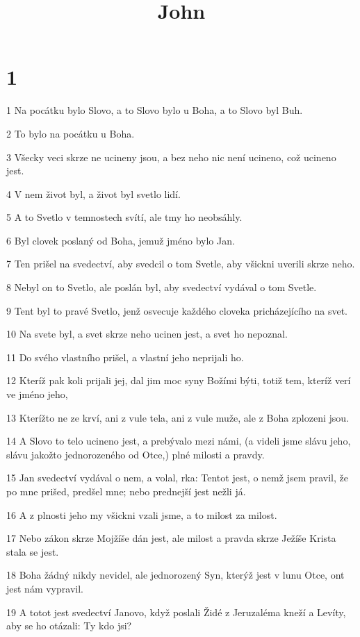 

\title{John}

\chapter{1}

\par 1 Na pocátku bylo Slovo, a to Slovo bylo u Boha, a to Slovo byl Buh.
\par 2 To bylo na pocátku u Boha.
\par 3 Všecky veci skrze ne ucineny jsou, a bez neho nic není ucineno, což ucineno jest.
\par 4 V nem život byl, a život byl svetlo lidí.
\par 5 A to Svetlo v temnostech svítí, ale tmy ho neobsáhly.
\par 6 Byl clovek poslaný od Boha, jemuž jméno bylo Jan.
\par 7 Ten prišel na svedectví, aby svedcil o tom Svetle, aby všickni uverili skrze neho.
\par 8 Nebyl on to Svetlo, ale poslán byl, aby svedectví vydával o tom Svetle.
\par 9 Tent byl to pravé Svetlo, jenž osvecuje každého cloveka pricházejícího na svet.
\par 10 Na svete byl, a svet skrze neho ucinen jest, a svet ho nepoznal.
\par 11 Do svého vlastního prišel, a vlastní jeho neprijali ho.
\par 12 Kteríž pak koli prijali jej, dal jim moc syny Božími býti, totiž tem, kteríž verí ve jméno jeho,
\par 13 Kterížto ne ze krví, ani z vule tela, ani z vule muže, ale z Boha zplozeni jsou.
\par 14 A Slovo to telo ucineno jest, a prebývalo mezi námi, (a videli jsme slávu jeho, slávu jakožto jednorozeného od Otce,) plné milosti a pravdy.
\par 15 Jan svedectví vydával o nem, a volal, rka: Tentot jest, o nemž jsem pravil, že po mne prišed, predšel mne; nebo prednejší jest nežli já.
\par 16 A z plnosti jeho my všickni vzali jsme, a to milost za milost.
\par 17 Nebo zákon skrze Mojžíše dán jest, ale milost a pravda skrze Ježíše Krista stala se jest.
\par 18 Boha žádný nikdy nevidel, ale jednorozený Syn, kterýž jest v lunu Otce, ont jest nám vypravil.
\par 19 A totot jest svedectví Janovo, když poslali Židé z Jeruzaléma kneží a Levíty, aby se ho otázali: Ty kdo jsi?
